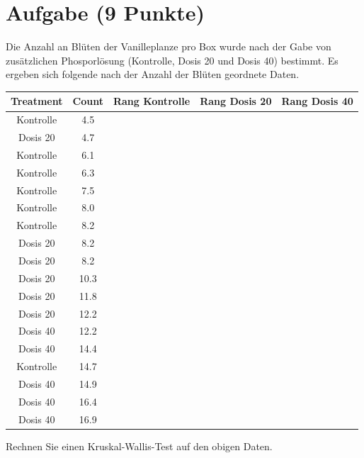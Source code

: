 \documentclass[a4paper, 10pt]{scrartcl}\usepackage[]{graphicx}\usepackage[]{color}
\newenvironment{knitrout}{}{} %
\begin{document}
\section{Aufgabe \hfill (9 Punkte)}



Die Anzahl an Bl{\"u}ten der Vanilleplanze pro Box wurde nach der Gabe von
zus{\"a}tzlichen Phosporl{\"o}sung (Kontrolle, Dosis 20 und Dosis 40) bestimmt. Es
ergeben sich folgende nach der Anzahl der Bl{\"u}ten geordnete Daten.

\begin{knitrout}
\color{fgcolor}\begin{table}[!h]
\centering
\begin{tabular}{ccccc}
\toprule
Treatment & Count & Rang Kontrolle & Rang Dosis 20 & Rang Dosis 40\\
\midrule
Kontrolle & 4.5 &  &  & \\
Dosis 20 & 4.7 &  &  & \\
Kontrolle & 6.1 &  &  & \\
Kontrolle & 6.3 &  &  & \\
Kontrolle & 7.5 &  &  & \\
\addlinespace
Kontrolle & 8.0 &  &  & \\
Kontrolle & 8.2 &  &  & \\
Dosis 20 & 8.2 &  &  & \\
Dosis 20 & 8.2 &  &  & \\
Dosis 20 & 10.3 &  &  & \\
\addlinespace
Dosis 20 & 11.8 &  &  & \\
Dosis 20 & 12.2 &  &  & \\
Dosis 40 & 12.2 &  &  & \\
Dosis 40 & 14.4 &  &  & \\
Kontrolle & 14.7 &  &  & \\
\addlinespace
Dosis 40 & 14.9 &  &  & \\
Dosis 40 & 16.4 &  &  & \\
Dosis 40 & 16.9 &  &  & \\
\bottomrule
\end{tabular}
\end{table}

\end{knitrout}

Rechnen Sie einen Kruskal-Wallis-Test auf den obigen Daten.
\end{document}
